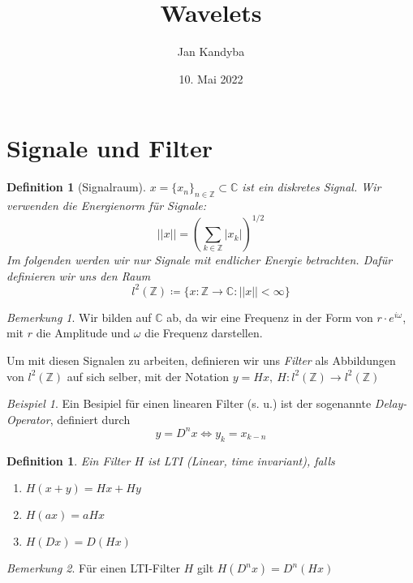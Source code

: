 \documentclass[]{scrartcl}
\title{Wavelets}
\author{Jan Kandyba}
\date{10. Mai 2022}
\theoremstyle{plain}
\newtheorem{defn}[theo]{Definition}
\theoremstyle{remark}
\newtheorem*{bsp}{Beispiel}
\newtheorem*{bem}{Bemerkung}
\begin{document}
    \maketitle

    \section{Signale und Filter}

    \begin{defn}[Signalraum]
        $x = \{ x_n \}_{n \in \mathbb{Z}} \subset \mathbb{C}$ ist ein diskretes Signal.
        Wir verwenden die Energienorm für Signale:
        $$||x|| = (\sum_{k \in \mathbb{Z}} |x_k|)^{1/2}$$
        Im folgenden werden wir nur Signale mit endlicher Energie betrachten. Dafür definieren wir uns den Raum
        $$l^2(\mathbb{Z}) \coloneqq \{x: \mathbb{Z} \to \mathbb{C} : ||x|| < \infty\}$$
    \end{defn}

    \begin{bem}
        Wir bilden auf $\mathbb{C}$ ab, da wir eine Frequenz in der Form von $r \cdot e^{i\omega}$, mit $r$ die Amplitude und $\omega$ die Frequenz darstellen.
    \end{bem}

    Um mit diesen Signalen zu arbeiten, definieren wir uns \emph{Filter} als Abbildungen von $l^2(\mathbb{Z})$ auf sich selber, mit der Notation $y = Hx, \: H: l^2(\mathbb{Z}) \to l^2(\mathbb{Z})$

    \begin{bsp}
        Ein Besipiel für einen linearen Filter (s. u.) ist der sogenannte \emph{Delay-Operator}, definiert durch
        $$y = D^nx \Leftrightarrow y_k = x_{k-n}$$
    \end{bsp}

    \begin{defn}
        Ein Filter $H$ ist \emph{LTI} (Linear, time invariant), falls
        \begin{enumerate}[label=(\roman*)]
            \item $H(x + y) = Hx + Hy$
            \item $H(ax) = aHx \: $
            \item $H(Dx) = D(Hx) \: $
        \end{enumerate}
    \end{defn}

    \begin{bem}
        Für einen LTI-Filter $H$ gilt $H(D^nx)=D^n(Hx)$
    \end{bem}
\end{document}
